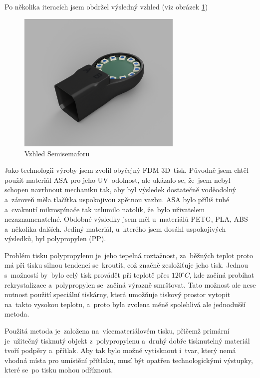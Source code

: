 Po několika iteracích jsem obdržel výsledný vzhled (viz obrázek \ref{Semisemafor-box-render})
\begin{figure}[!h]
  \begin{center}
    \includegraphics[width=0.7\textwidth]{text/PraktickaCast/img/Semisemafor-BOX-render.png}
  \end{center}
  \caption{Vzhled Semisemaforu}
  \label{Semisemafor-box-render}
\end{figure}

Jako technologii výroby jsem zvolil obyčejný FDM 3D~tisk.
Původně jsem chtěl použít materiál ASA pro jeho UV~odolnost, ale ukázalo se, že~jsem nebyl schopen navrhnout mechaniku tak, aby byl výsledek dostatečně voděodolný a~zároveň měla tlačítka uspokojivou zpětnou vazbu.
ASA bylo příliš tuhé a~cvaknutí mikrospínače tak utlumilo natolik, že~bylo uživatelem nezaznamenatelné.
Obdobné výsledky jsem měl u~materiálů PETG, PLA, ABS a~několika dalších.
Jediný materiál, u~kterého jsem dosáhl uspokojivých výsledků, byl polypropylen (PP).

Problém tisku polypropylenu je~jeho tepelná roztažnost, za~běžných teplot proto má při tisku silnou tendenci se~kroutit, což značně zesložiťuje jeho tisk.
Jednou s~možností by~bylo celý tisk provádět při teplotě přes \(120^\circ C\), kde začíná probíhat rekrystalizace a~polypropylen se~začíná výrazně smršťovat.
Tato možnost ale nese nutnost použití speciální tiskárny, která umožňuje tiskový prostor vytopit na~takto vysokou teplotu, a~proto byla zvolena méně spolehlivá ale jednodušší metoda.

Použitá metoda je~založena na~vícemateriálovém tisku, přičemž primární je~užitečný tisknutý objekt z~polypropylenu a~druhý dobře tisknutelný materiál tvoří podpěry a~přítlak.
Aby tak bylo možné vytisknout i~tvar, který nemá vhodná místa pro umístění přítlaku, musí být opatřen technologickými výstupky, které se~po tisku mohou odříznout.

